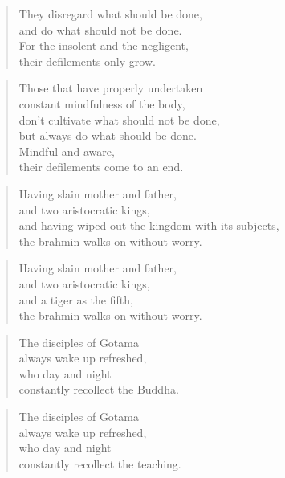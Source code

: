 \documentclass[12pt,openany]{book}%
\begin{document}
\begin{verse}%
They disregard what should be done, \\
and do what should not be done. \\
For the insolent and the negligent, \\
their defilements only grow. 

%
\end{verse}

\begin{verse}%
Those that have properly undertaken \\
constant mindfulness of the body, \\
don’t cultivate what should not be done, \\
but always do what should be done. \\
Mindful and aware, \\
their defilements come to an end. 

%
\end{verse}

\begin{verse}%
Having slain mother and father, \\
and two aristocratic kings, \\
and having wiped out the kingdom with its subjects, \\
the brahmin walks on without worry. 

%
\end{verse}

\begin{verse}%
Having slain mother and father, \\
and two aristocratic kings, \\
and a tiger as the fifth, \\
the brahmin walks on without worry. 

%
\end{verse}

\begin{verse}%
The disciples of Gotama \\
always wake up refreshed, \\
who day and night \\
constantly recollect the Buddha. 

%
\end{verse}

\begin{verse}%
The disciples of Gotama \\
always wake up refreshed, \\
who day and night \\
constantly recollect the teaching. 

%
\end{verse}
\end{document}
